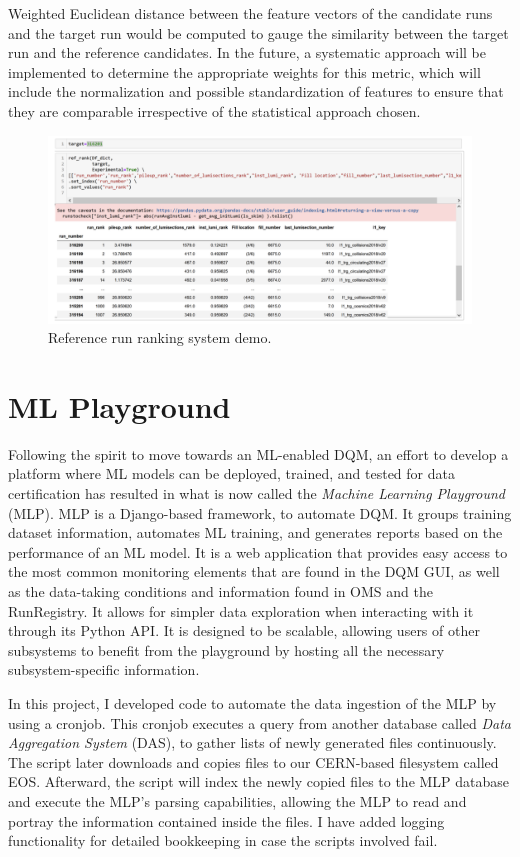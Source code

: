 Weighted Euclidean distance between the feature vectors of the candidate runs and the target run would be computed to gauge the similarity between the target run and the reference candidates. In the future, a systematic approach will be implemented to determine the appropriate weights for this metric, which will include the normalization and possible standardization of features to ensure that they are comparable irrespective of the statistical approach chosen.


\begin{figure}
	\centering
	\includegraphics[width=\linewidth]{Images/ranking.png}
	\caption{Reference run ranking system demo.}
	\label{fig:ranking}
\end{figure}


\section{ML Playground}\label{sect:MLP}
Following the spirit to move towards an ML-enabled DQM, an effort to develop a platform where ML models can be deployed, trained, and tested for data certification has resulted in what is now called the \textit{Machine Learning Playground} (MLP). MLP is a Django-based framework, to automate DQM\cite{Wachirapusitan_2023}. It groups training dataset information, automates ML training, and generates reports based on the performance of an ML model. It is a web application that provides easy access to the most common monitoring elements that are found in the DQM GUI, as well as the data-taking conditions and information found in OMS and the RunRegistry. It allows for simpler data exploration when interacting with it through its Python API. It is designed to be scalable, allowing users of other subsystems to benefit from the playground by hosting all the necessary subsystem-specific information.

In this project, I developed code to automate the data ingestion of the MLP by using a cronjob. This cronjob executes a query from another database called \textit{Data Aggregation System} (DAS), to gather lists of newly generated files continuously. The script later downloads and copies files to our CERN-based filesystem called EOS. Afterward, the script will index the newly copied files to the MLP database and execute the MLP's parsing capabilities, allowing the MLP to read and portray the information contained inside the files.
I have added logging functionality for detailed bookkeeping in case the scripts involved fail.


